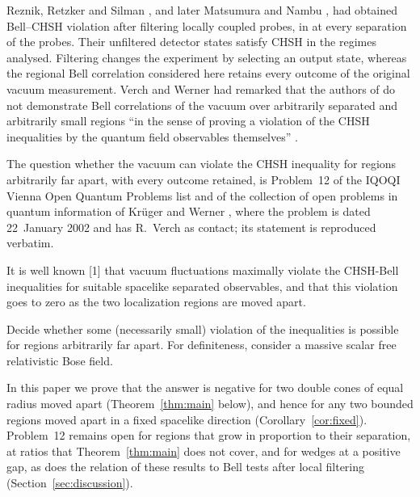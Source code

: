 \documentclass[11pt]{amsart}
\numberwithin{equation}{section}
\theoremstyle{definition}
\begin{document}
Reznik, Retzker and Silman
\cite{RRS05}, and later Matsumura and Nambu \cite{MN20}, had obtained
Bell--CHSH violation after filtering locally coupled probes, in
\cite{RRS05} at every separation of the probes. Their
unfiltered detector states satisfy CHSH in the regimes analysed.
Filtering changes the experiment by selecting an output state, whereas
the regional Bell correlation considered here retains every outcome of
the original vacuum measurement. Verch and Werner had remarked that
the authors of \cite{RRS05} do not demonstrate Bell correlations of the
vacuum over arbitrarily separated and arbitrarily small regions ``in the
sense of proving a violation of the CHSH inequalities by the quantum field
observables themselves'' \cite[Section~7]{VW05}.

The question whether the vacuum can violate the CHSH inequality for
regions arbitrarily far apart, with every outcome retained, is Problem~12
of the IQOQI Vienna Open
Quantum Problems list \cite{OQP12} and of the collection of open
problems in quantum information of Krüger and Werner \cite{KW05}, where
the problem is dated 22~January 2002 and has R.~Verch as contact; its statement
is reproduced verbatim.\footnotemark[1]

\begin{tcolorbox}[enhanced,breakable,sharp corners,boxrule=0.5pt,
colframe=black!60,colback=gray!4,
title={Problem 12: Bell Inequalities for long range vacuum correlations (IQOQI Vienna Open Quantum Problems \cite{OQP12})},
fonttitle=\bfseries]
It is well known [1] that vacuum fluctuations maximally violate the CHSH-Bell inequalities for suitable spacelike separated observables, and that this violation goes to zero as the two localization regions are moved apart.

Decide whether some (necessarily small) violation of the inequalities is possible for regions arbitrarily far apart. For definiteness, consider a massive scalar free relativistic Bose field.
\end{tcolorbox}

In this paper we prove that the answer is negative for two double cones
of equal radius moved apart (Theorem~\ref{thm:main} below), and hence for
any two bounded regions moved apart in a fixed spacelike direction
(Corollary~\ref{cor:fixed}). Problem~12 remains open for regions that
grow in proportion to their separation, at ratios that
Theorem~\ref{thm:main} does not cover, and for wedges at a positive gap, as does the
relation of these results to Bell tests after local filtering
(Section~\ref{sec:discussion}).
\end{document}
